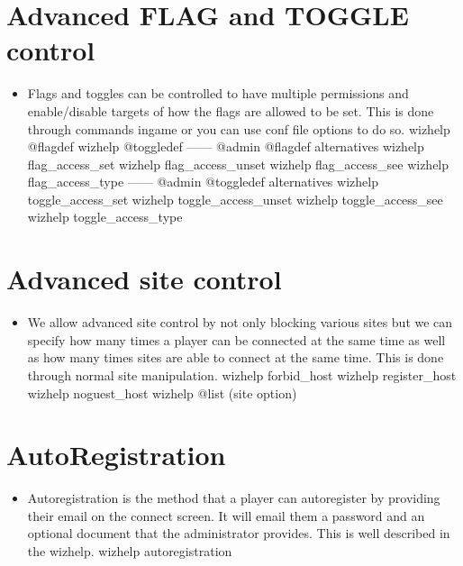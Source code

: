 \documentclass[letterpaper,10pt,english]{sphinxmanual}
\begin{document}
\section{Advanced FLAG and TOGGLE control}
\label{\detokenize{12-advanced:advanced-flag-and-toggle-control}}\begin{itemize}
\item {} 
\sphinxAtStartPar
Flags and toggles can be controlled to have multiple permissions
and enable/disable targets of how the flags are allowed to be
set.  This is done through commands in\sphinxhyphen{}game or you can use
conf file options to do so.
\sphinxhyphen{} wizhelp @flagdef
\sphinxhyphen{} wizhelp @toggledef
——\sphinxhyphen{} @admin @flagdef alternatives
\sphinxhyphen{} wizhelp flag\_access\_set
\sphinxhyphen{} wizhelp flag\_access\_unset
\sphinxhyphen{} wizhelp flag\_access\_see
\sphinxhyphen{} wizhelp flag\_access\_type
——\sphinxhyphen{} @admin @toggledef alternatives
\sphinxhyphen{} wizhelp toggle\_access\_set
\sphinxhyphen{} wizhelp toggle\_access\_unset
\sphinxhyphen{} wizhelp toggle\_access\_see
\sphinxhyphen{} wizhelp toggle\_access\_type

\end{itemize}


\section{Advanced site control}
\label{\detokenize{12-advanced:advanced-site-control}}\begin{itemize}
\item {} 
\sphinxAtStartPar
We allow advanced site control by not only blocking various sites
but we can specify how many times a player can be connected at the
same time as well as how many times sites are able to connect at
the same time.  This is done through normal site manipulation.
\sphinxhyphen{} wizhelp forbid\_host
\sphinxhyphen{} wizhelp register\_host
\sphinxhyphen{} wizhelp noguest\_host
\sphinxhyphen{} wizhelp @list (site option)

\end{itemize}


\section{Auto\sphinxhyphen{}Registration}
\label{\detokenize{12-advanced:auto-registration}}\begin{itemize}
\item {} 
\sphinxAtStartPar
Autoregistration is the method that a player can auto\sphinxhyphen{}register
by providing their email on the connect screen.  It will email
them a password and an optional document that the administrator
provides.  This is well described in the wizhelp.
\sphinxhyphen{} wizhelp autoregistration

\end{itemize}
\end{document}
